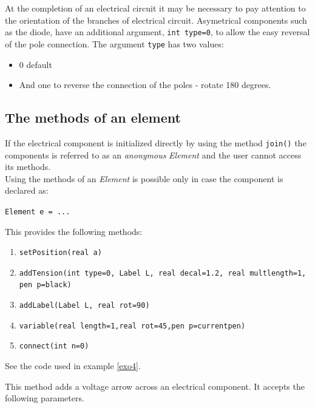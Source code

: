 \documentclass[10pt]{article}
\begin{document}

At the completion of an electrical circuit it may be necessary to pay attention to the orientation of the branches of electrical circuit. Asymetrical components such as the diode, have an additional argument, \verb|int type=0|, to allow the easy reversal of the pole connection. The argument \verb|type| has two values:
\begin{itemize}
    \item 0 default
    \item And one to reverse the connection of the poles - rotate 180 degrees.
\end{itemize}


\subsection{The methods of an element}

If the electrical component is initialized directly by using the method \verb|join()| the components is referred to as an \emph{anonymous} \emph{Element} and the user cannot access its methods.\\
Using the methods of an \emph{Element} is possible only in case the component is declared as:
\begin{center}
\verb|Element e = ...|
\end{center}

This provides the following methods:
\begin{enumerate}
\item \verb|setPosition(real a)|
\item \verb|addTension(int type=0, Label L, real decal=1.2, real multlength=1, pen p=black)|
\item \verb|addLabel(Label L, real rot=90)|
\item \verb|variable(real length=1,real rot=45,pen p=currentpen)|
\item \verb|connect(int n=0)|
\end{enumerate}

{}
See the code used in example \ref{exo4}.

{}
This method adds a voltage arrow across an electrical component. It accepts the following parameters.
\end{document}
